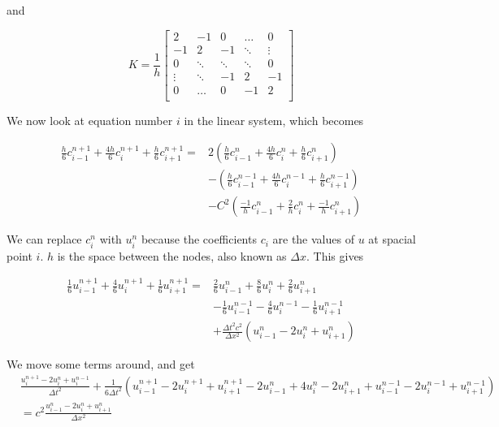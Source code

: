 \documentclass[twoside]{article}
\begin{document}
and

\begin{equation}
K = \frac{1}{h}\left[
\begin{matrix}
2 & -1 & 0 & \hdots & 0\\
-1 & 2 & -1 & \ddots & \vdots\\
0 & \ddots & \ddots & \ddots & 0\\
\vdots & \ddots & -1 & 2 & -1\\
0 & \hdots & 0 & -1 & 2\\
\end{matrix}\right] 
\end{equation}

We now look at equation number $i$ in the linear system, which becomes

\begin{align*}
\frac{h}{6}c_{i-1}^{n+1} + \frac{4h}{6}c_{i}^{n+1} + \frac{h}{6}c_{i+1}^{n+1} = &2\left(\frac{h}{6}c_{i-1}^{n} + \frac{4h}{6}c_{i}^{n} + \frac{h}{6}c_{i+1}^{n}\right)\\
&- \left(\frac{h}{6}c_{i-1}^{n-1} + \frac{4h}{6}c_{i}^{n-1} +\frac{h}{6}c_{i+1}^{n-1}\right)\\
&- C^2\left( \frac{-1}{h}c_{i-1}^{n} + \frac{2}{h}c_{i}^{n} + \frac{-1}{h}c_{i+1}^{n}\right)
\end{align*}

We can replace $c_i^n$ with $u_i^n$ because the coefficients $c_i$ are the values of $u$ at spacial point $i$. $h$ is the space between the nodes, also known as $\Delta x$. This gives

\begin{align*}
\frac{1}{6}u_{i-1}^{n+1} + \frac{4}{6}u_{i}^{n+1} + \frac{1}{6}u_{i+1}^{n+1} = &\frac{2}{6}u_{i-1}^{n} + \frac{8}{6}u_{i}^{n} + \frac{2}{6}u_{i+1}^{n}\\
&- \frac{1}{6}u_{i-1}^{n-1} - \frac{4}{6}u_{i}^{n-1} -\frac{1}{6}u_{i+1}^{n-1}\\
&+ \frac{\Delta t^2 c^2}{\Delta x^2}\left(u_{i-1}^{n} -2u_{i}^{n} + u_{i+1}^{n}\right)
\end{align*}

We move some terms around, and get
\begin{align*}
&\frac{u_{i}^{n+1} - 2u_{i}^{n} + u_{i}^{n-1}}{\Delta t^2} + 
\frac{1}{6\Delta t^2}\left(u_{i-1}^{n+1} -2 u_{i}^{n+1} + u_{i+1}^{n+1} - 2u_{i-1}^{n} + 4u_{i}^{n} - 2u_{i+1}^{n} + u_{i-1}^{n-1}
-2u_{i}^{n-1} +  u_{i+1}^{n-1}\right)\\
 &= c^2\frac{u_{i-1}^{n} -2u_{i}^{n} + u_{i+1}^{n}}{\Delta x^2}
\end{align*}
\end{document}
